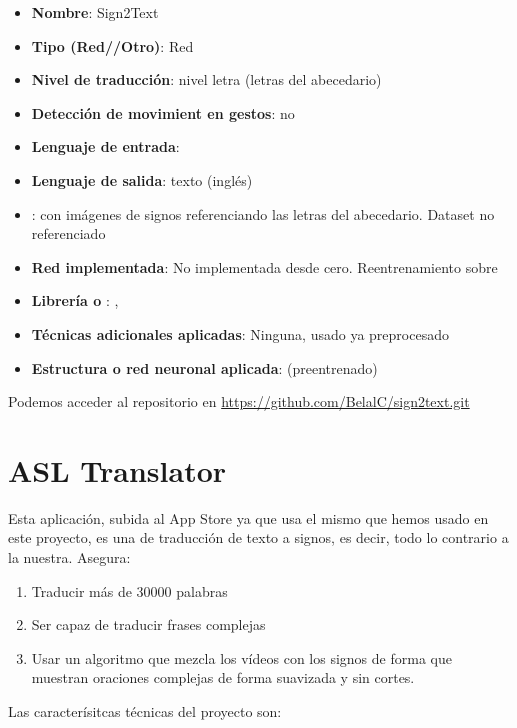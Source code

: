 \begin{itemize}
  \item \textbf{Nombre}: Sign2Text
  \item \textbf{Tipo (Red//Otro)}: Red
  \item \textbf{Nivel de traducción}: nivel letra (letras del abecedario)
  \item \textbf{Detección de movimient en gestos}: no
  \item \textbf{Lenguaje de entrada}: 
  \item \textbf{Lenguaje de salida}: texto (inglés)
  \item \textbf{}:  con imágenes de signos referenciando las letras del abecedario. Dataset no referenciado
  \item \textbf{Red implementada}: No implementada desde cero. Reentrenamiento sobre 
  \item \textbf{Librería o }: , 
  \item \textbf{Técnicas adicionales aplicadas}: Ninguna,  usado ya preprocesado
  \item \textbf{Estructura o red neuronal aplicada}:  (preentrenado)
\end{itemize}

Podemos acceder al repositorio en \url{https://github.com/BelalC/sign2text.git}

\section{ASL Translator}

Esta aplicación, subida al App Store ya que usa el mismo  que hemos usado en este proyecto, es una  de traducción de texto a signos, es decir, todo lo contrario a la nuestra. Asegura:

\begin{enumerate}
  \item Traducir más de 30000 palabras
  \item Ser capaz de traducir frases complejas
  \item Usar un algoritmo que mezcla los vídeos con los signos de forma que muestran oraciones complejas de forma suavizada y sin cortes.
\end{enumerate}

Las caracterísitcas técnicas del proyecto son:

